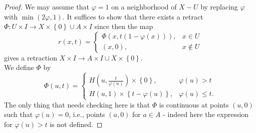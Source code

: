 \begin{proof}
    We may assume that $\varphi  = 1$ on a neighborhood
    of $X - U$ by replacing $\varphi $ with
    $\min \left( 2 \varphi , 1 \right) $.
    It suffices to show that there exists a retract
    $\Phi \colon U \times I \to X \times \left\{ 0 \right\} 
    \cup A \times I$ since then the
    map
    \[
    r\left( x,t \right) 
    =
    \begin{cases}
        \Phi\left( x, t \left( 1-\varphi (x) \right)  \right),&
        x \in U\\
        (x,0),& x \not\in U
    \end{cases}
    \] 
    gives a retraction $X \times I \to A \times I \cup 
    X \times \left\{ 0 \right\} $.\\
    We define $\Phi$ by
    \[
    \Phi(u,t) = 
    \begin{cases}
        H\left( u, \frac{t}{\varphi (u)} \right) \times 
        \left\{ 0 \right\},& \varphi (u) > t\\
        H\left( u,1 \right) \times 
        \left\{ t- \varphi (u) \right\} ,& \varphi (u)\le t.
    \end{cases}
    \] 
    The only thing that needs checking here is
    that $\Phi$ is continuous at
    points $\left( u,0 \right) $ such that
    $\varphi (u) = 0$, i.e., points $(a,0)$ for 
    $a \in A$ - indeed here the expression for
    $\varphi (u) > t$ is not defined.


\end{proof}
